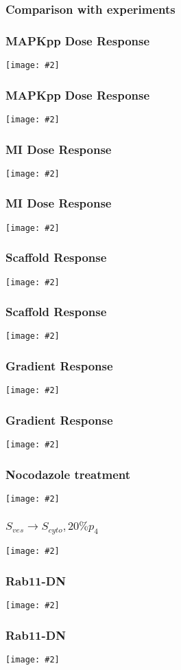 \documentclass{beamer}
\newcommand{\plotslide}[2]{
  \begin{frame}
    \frametitle{#1}
    \centering
    \texttt{[image: \#2]}
  \end{frame}
}
\begin{document}
\begin{frame}
  \frametitle{Comparison with experiments}
\end{frame}

\plotslide{MAPKpp Dose Response}{../hao/dose_response_ERK_t.png}
\plotslide{MAPKpp Dose Response}{InputVsMAPKpp.pdf} 

\plotslide{MI Dose Response}{../hao/dose_response_MI_t.png}
\plotslide{MI Dose Response}{InputVsMI.pdf}

\plotslide{Scaffold Response}{../hao/exp-MIvsS_t.png}
\plotslide{Scaffold Response}{ScaffoldVsMAPKppMI.pdf}

\plotslide{Gradient Response}{../hao/gradient_response_t.png}
\plotslide{Gradient Response}{GradientVsMI.pdf}

\plotslide{Nocodazole treatment}{../hao/noco_t.png}
\plotslide{$S_{ves} \rightarrow S_{cyto}, 20\%  p_4 $}{noco.pdf}

\plotslide{Rab11-DN}{../hao/Rab11DN_t.png}
\plotslide{Rab11-DN}{rab11dn.pdf}

\end{document}
